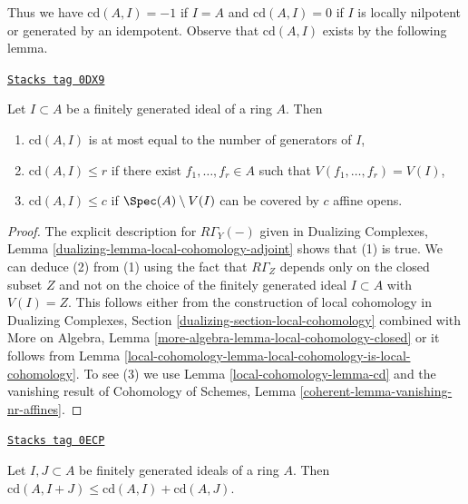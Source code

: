 Thus we have $\text{cd}(A, I) = -1$ if
$I = A$ and $\text{cd}(A, I) = 0$ if $I$ is locally nilpotent
or generated by an idempotent.
Observe that $\text{cd}(A, I)$ exists by the following lemma.

\begin{lemma}[Bound cd]
\label{local-cohomology-lemma-bound-cd}
\href{https://stacks.math.columbia.edu/tag/0DX9}{\texttt{Stacks tag 0DX9}}

Let $I \subset A$ be a finitely generated ideal of a ring $A$.
Then
\begin{enumerate}
\item $\text{cd}(A, I)$ is at most equal to the number of
generators of $I$,
\item $\text{cd}(A, I) \leq r$ if there exist $f_1, \ldots, f_r \in A$
such that $V(f_1, \ldots, f_r) = V(I)$,
\item $\text{cd}(A, I) \leq c$ if $\Spec(A) \setminus V(I)$
can be covered by $c$ affine opens.
\end{enumerate}
\end{lemma}

\begin{proof}
The explicit description for $R\Gamma_Y(-)$ given in
Dualizing Complexes, Lemma \ref{dualizing-lemma-local-cohomology-adjoint}
shows that (1) is true. We can deduce (2) from (1) using the
fact that $R\Gamma_Z$ depends only on the closed subset
$Z$ and not on the choice of the finitely generated ideal
$I \subset A$ with $V(I) = Z$. This follows either from the
construction of local cohomology in
Dualizing Complexes, Section \ref{dualizing-section-local-cohomology}
combined with
More on Algebra, Lemma \ref{more-algebra-lemma-local-cohomology-closed}
or it follows from Lemma \ref{local-cohomology-lemma-local-cohomology-is-local-cohomology}.
To see (3) we use Lemma \ref{local-cohomology-lemma-cd}
and the vanishing result of Cohomology of Schemes, Lemma
\ref{coherent-lemma-vanishing-nr-affines}.
\end{proof}

\begin{lemma}[Cd sum]
\label{local-cohomology-lemma-cd-sum}
\href{https://stacks.math.columbia.edu/tag/0ECP}{\texttt{Stacks tag 0ECP}}

Let $I, J \subset A$ be finitely generated ideals of a ring $A$.
Then $\text{cd}(A, I + J) \leq \text{cd}(A, I) + \text{cd}(A, J)$.
\end{lemma}

